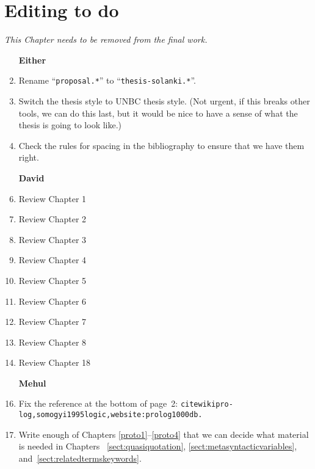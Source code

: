

\section{Editing to do}\label{sect:to-do}

\textit{\color{red} This Chapter needs to be removed from the final
  work.}

\begin{enumerate}
\item [\textbf{Either}]
\item Rename ``\Verb!proposal.*!'' to ``\Verb!thesis-solanki.*!''.
\item Switch the thesis style to UNBC thesis style.  (Not urgent, if
  this breaks other tools, we can do this last, but it would be nice to
  have a sense of what the thesis is going to look like.)
\item
  Check the rules for spacing in the bibliography to ensure that we have
  them right.
  
\item [\textbf{David}]
\item Review Chapter 1
\item Review Chapter 2
\item Review Chapter 3
\item Review Chapter 4
\item Review Chapter 5
\item Review Chapter 6
\item Review Chapter 7
\item Review Chapter 8
\item Review Chapter 18

\item [\textbf{Mehul}]
\item
  Fix the reference at the bottom of page~2:
  \Verb!citewikipro- log,somogyi1995logic,website:prolog1000db.!
\item
  Write enough of Chapters \ref{proto1}--\ref{proto4} that we can decide
  what material is needed in Chapters~ \ref{sect:quasiquotation},
  \ref{sect:metasyntacticvariables},
  and~\ref{sect:relatedtermskeywords}.


\end{enumerate}
